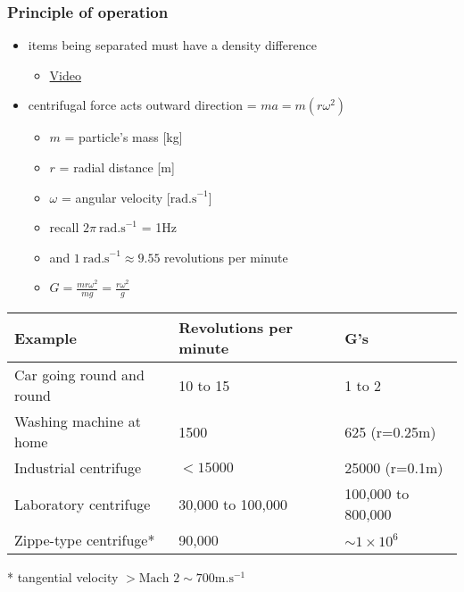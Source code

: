 \begin{frame}\frametitle{Principle of operation}
	
	\begin{itemize}
		\item	items being separated must have a density difference
			\begin{itemize}
				\item	\href{http://www.youtube.com/watch?v=M1vWI0t-XD8}{Video}
			\end{itemize}
		\item	centrifugal force acts outward direction = $ma = m (r\omega^2)$
		\begin{itemize}
			\item	$m$ = particle's mass [kg]
			\item	$r$ = radial distance [m]
			\item	$\omega$ = angular velocity  [$\text{rad.s}^{-1}$] 			
			\item	recall $2\pi~\text{rad.s}^{-1}$ = 1Hz
			\item	and $1~\text{rad.s}^{-1} \approx 9.55$ revolutions per minute
			\item	$G = \displaystyle \frac{m r\omega^2}{mg} = \displaystyle \frac{r\omega^2}{g}$
		\end{itemize}
	\end{itemize}	
	\vspace{12pt}
	\small
	\begin{tabular}{l|l|l}
		
		\textbf{Example}							& \textbf{Revolutions per minute}  & \textbf{G's}\\		 \hline
		Car going round and round 	    			& 10 to 15   			  & 1 to 2	\\
		Washing machine at home 					& 1500       			  & 625 (r=0.25m)	\\
		Industrial centrifuge						& $<15 000$ 			  & 25000 (r=0.1m)	\\
		Laboratory centrifuge 						& 30,000 to 100,000       & 100,000 to 800,000\\
		Zippe-type centrifuge*						& 90,000                  & $\sim 1 \times 10^6$ \\ \hline
	\end{tabular}		
	* tangential velocity $> \text{Mach 2} \sim 700 \text{m.s}^{-1}$
\end{frame}

